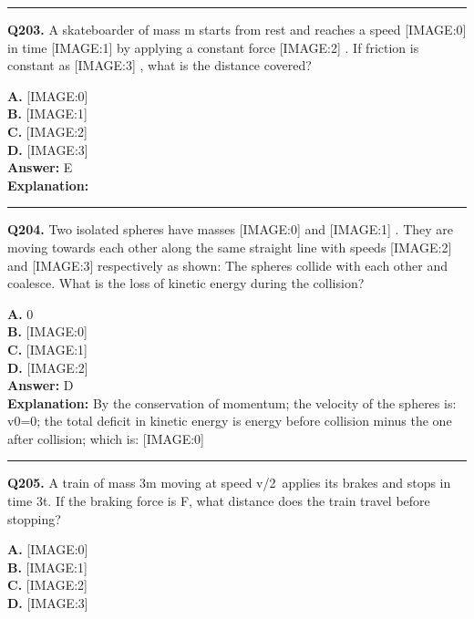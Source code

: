 \documentclass[12pt]{article}
\begin{document}
\hrule
\vspace{1em}


\noindent
\textbf{Q203.} A skateboarder of mass m
starts from rest and reaches a speed
[IMAGE:0]
in time
[IMAGE:1]
by applying a constant force
[IMAGE:2]
. If friction is constant as
[IMAGE:3]
, what is the distance covered?



\textbf{A.} [IMAGE:0] \\
\textbf{B.} [IMAGE:1] \\
\textbf{C.} [IMAGE:2] \\
\textbf{D.} [IMAGE:3] \\

\textbf{Answer:} E \\
\textbf{Explanation:} 

\hrule
\vspace{1em}


\noindent
\textbf{Q204.} Two isolated spheres have masses
[IMAGE:0]
and
[IMAGE:1]
. They are moving towards each other along the same straight line with speeds
[IMAGE:2]
and
[IMAGE:3]
respectively as shown:
The spheres collide with each other and coalesce. What is the loss of kinetic energy during the collision?



\textbf{A.} 0 \\
\textbf{B.} [IMAGE:0] \\
\textbf{C.} [IMAGE:1] \\
\textbf{D.} [IMAGE:2] \\

\textbf{Answer:} D \\
\textbf{Explanation:} By the conservation of momentum; the velocity of the spheres is: v0=0; the total deficit in kinetic energy is energy before collision minus the one after collision; which is:
[IMAGE:0]

\hrule
\vspace{1em}


\noindent
\textbf{Q205.} A train of mass 3m moving at speed v/2 applies its brakes and stops in time 3t. If the braking force is F, what distance does the train travel before stopping?



\textbf{A.} [IMAGE:0] \\
\textbf{B.} [IMAGE:1] \\
\textbf{C.} [IMAGE:2] \\
\textbf{D.} [IMAGE:3] \\
\end{document}
